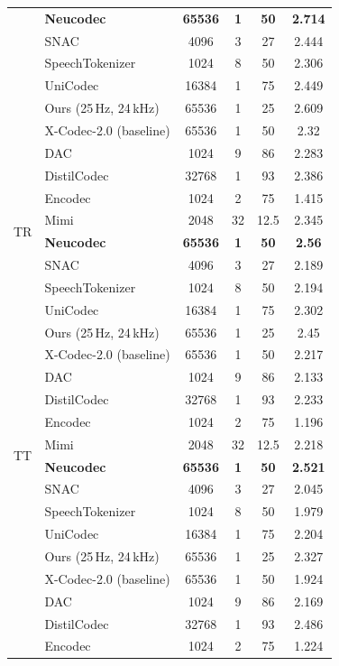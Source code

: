 \documentclass[preprint]{article}
\begin{document}
\begin{longtable}{llcccc}
  & \textbf{Neucodec} & \textbf{65536} & \textbf{1} & \textbf{50} & \textbf{2.714} \\
  & SNAC & 4096 & 3 & 27 & 2.444 \\
  & SpeechTokenizer & 1024 & 8 & 50 & 2.306 \\
  & UniCodec & 16384 & 1 & 75 & 2.449 \\
  & Ours (25\,Hz, 24\,kHz) & 65536 & 1 & 25 & 2.609 \\
  & X-Codec-2.0 (baseline) & 65536 & 1 & 50 & 2.32 \\
\midrule
\multirow{8}{*}{TR}
  & DAC & 1024 & 9 & 86 & 2.283 \\
  & DistilCodec & 32768 & 1 & 93 & 2.386 \\
  & Encodec & 1024 & 2 & 75 & 1.415 \\
  & Mimi & 2048 & 32 & 12.5 & 2.345 \\
  & \textbf{Neucodec} & \textbf{65536} & \textbf{1} & \textbf{50} & \textbf{2.56} \\
  & SNAC & 4096 & 3 & 27 & 2.189 \\
  & SpeechTokenizer & 1024 & 8 & 50 & 2.194 \\
  & UniCodec & 16384 & 1 & 75 & 2.302 \\
  & Ours (25\,Hz, 24\,kHz) & 65536 & 1 & 25 & 2.45 \\
  & X-Codec-2.0 (baseline) & 65536 & 1 & 50 & 2.217 \\
\midrule
\multirow{8}{*}{TT}
  & DAC & 1024 & 9 & 86 & 2.133 \\
  & DistilCodec & 32768 & 1 & 93 & 2.233 \\
  & Encodec & 1024 & 2 & 75 & 1.196 \\
  & Mimi & 2048 & 32 & 12.5 & 2.218 \\
  & \textbf{Neucodec} & \textbf{65536} & \textbf{1} & \textbf{50} & \textbf{2.521} \\
  & SNAC & 4096 & 3 & 27 & 2.045 \\
  & SpeechTokenizer & 1024 & 8 & 50 & 1.979 \\
  & UniCodec & 16384 & 1 & 75 & 2.204 \\
  & Ours (25\,Hz, 24\,kHz) & 65536 & 1 & 25 & 2.327 \\
  & X-Codec-2.0 (baseline) & 65536 & 1 & 50 & 1.924 \\
\newpage
\multirow{8}{*}{TW}
  & DAC & 1024 & 9 & 86 & 2.169 \\
  & DistilCodec & 32768 & 1 & 93 & 2.486 \\
  & Encodec & 1024 & 2 & 75 & 1.224 \\

\end{longtable}
\end{document}
